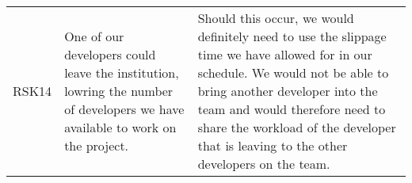 \begin{xltabular}[H]{\textwidth}{c | X | X}
    \midrule

    RSK14

    &

    One of our developers could leave the institution, lowring the number of developers we have available to work on the project.

    &

    Should this occur, we would definitely need to use the slippage time we have allowed for in our schedule. We would not be able to bring another developer into the team and would therefore need to share the workload of the developer that is leaving to the other developers on the team.\\

\end{xltabular}
\label{tbl:risk_table}
